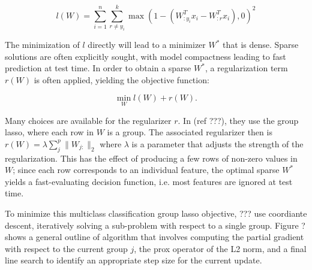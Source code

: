 \documentclass[11pt]{article}
\begin{document}
$$ l(W) = \sum_{i=1}^n \sum_{r\ne y_i}^k 
    \max\left(1 - (W_{:y_i}^Tx_i - W_{:r}^Tx_i), 0\right)^2 $$

The minimization of $l$ directly will lead to a minimizer $W^*$ that is
dense. Sparse solutions are often explicitly sought, with model compactness
leading to fast prediction at test time. In order to obtain a sparse $W^*$,
a regularization term $r(W)$ is often applied, yielding the objective 
function:

$$\min_W l(W) + r(W).$$

Many choices are available for the regularizer $r$. In (ref ???), they use
the group lasso, where each row in $W$ is a group. The associated regularizer 
then is $r(W) = \lambda\sum_j^p \|W_{j:}\|_2$ where $\lambda$ is a parameter
that adjusts the strength of the regularization.
This has the effect of producing a few rows of non-zero values in $W$;
since each row corresponds to an individual feature, the optimal sparse $W^*$
yields a fast-evaluating decision function, i.e. most features are 
ignored at test time.

To minimize this multiclass classification group lasso objective, ??? use 
coordiante descent, iteratively solving a sub-problem with respect to a 
single group. Figure ? shows a general outline of algorithm that involves
computing the partial gradient with respect to the 
current group $j$, the prox
operator of the L2 norm, and a final line search to identify an appropriate
step size for the current update.

\begin{algorithm}
\end{algorithm}
\end{document}
